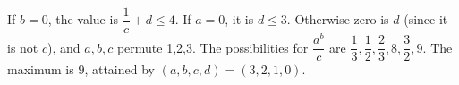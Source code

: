 If $ b=0 $, the value is $\dfrac{1}{c}+d\le4 $. If $ a=0 $, it is $ d\le3 $. Otherwise zero is $ d $ (since it is not $ c $), and $ a,b,c $ permute 1,2,3. The possibilities for $ \dfrac{a^b}{c} $ are $\dfrac{1}{3},\dfrac{1}{2},\dfrac{2}{3},8,\dfrac{3}{2},9 $. The maximum is $\boxed9 $, attained by $(a,b,c,d)=(3,2,1,0)$.
